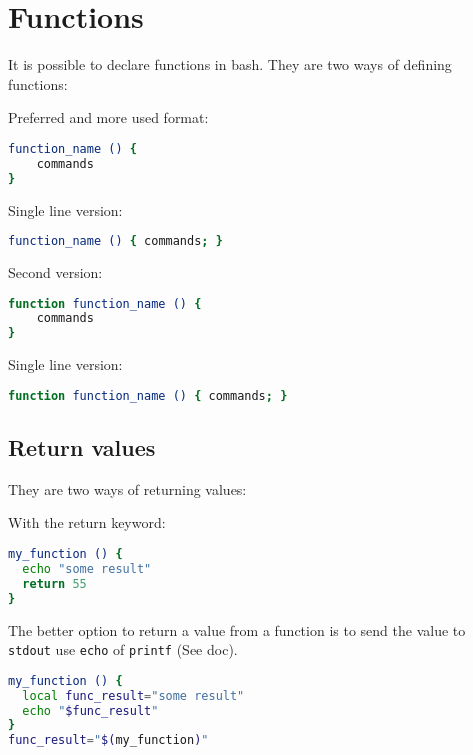 \documentclass{article}
\newcommand{\inlinecode}[1]{\colorbox{backcolour}{\footnotesize{\texttt{#1}}}}
\begin{document}
\pagebreak

\section{Functions}
It is possible to declare functions in bash. They are two ways of defining functions:

\begin{paracol}{2}

	Preferred and more used format:

	\begin{lstlisting}[style=command, language=bash]
function_name () {
    commands
}
\end{lstlisting}

	Single line version:

	\begin{lstlisting}[style=command, language=bash]
function_name () { commands; }
\end{lstlisting}

	\switchcolumn

	Second version:

	\begin{lstlisting}[style=command, language=bash]
function function_name () {
    commands
}
\end{lstlisting}

	Single line version:

	\begin{lstlisting}[style=command, language=bash]
function function_name () { commands; }
\end{lstlisting}
\end{paracol}

\subsection{Return values}
They are two ways of returning values:

\begin{paracol}{2}
	With the return keyword:
	\begin{lstlisting}[style=command, language=bash]
my_function () {
  echo "some result"
  return 55
}
\end{lstlisting}

	\switchcolumn

	The better option to return a value from a function is to send the value to \inlinecode{stdout} use \inlinecode{echo} of \inlinecode{printf} (See doc).

	\begin{lstlisting}[style=command, language=bash]
my_function () {
  local func_result="some result"
  echo "$func_result"
}
func_result="$(my_function)"
\end{lstlisting}

\end{paracol}
\end{document}
